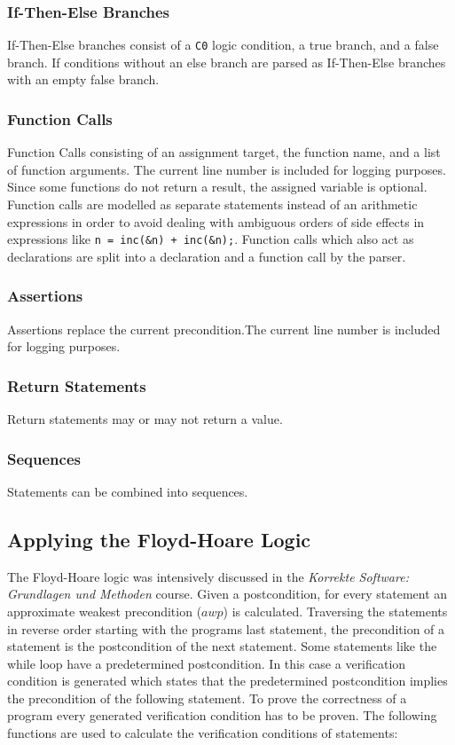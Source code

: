 \documentclass[12pt]{article}
\begin{document}
\subsubsection*{If-Then-Else Branches}
If-Then-Else branches consist of a \texttt{C0} logic condition, a true branch, and a false branch.
If conditions without an else branch are parsed as If-Then-Else branches with an empty false branch.

\subsubsection*{Function Calls}
Function Calls consisting of an assignment target, the function name, and a list of function arguments. The current line number is included for logging purposes. Since some functions do not return a result, the assigned variable is optional.
Function calls are modelled as separate statements instead of an arithmetic expressions in order to avoid dealing with ambiguous orders of side effects in expressions like \texttt{n = inc(\&n) + inc(\&n);}.
Function calls which also act as declarations are split into a declaration and a function call by the parser.

\subsubsection*{Assertions}
Assertions replace the current precondition.The current line number is included for logging purposes.

\subsubsection*{Return Statements}
Return statements may or may not return a value.

\subsubsection*{Sequences}
Statements can be combined into sequences.

\subsection{Applying the Floyd-Hoare Logic}

The Floyd-Hoare logic was intensively discussed in the \emph{Korrekte Software: Grundlagen und Methoden} course. 
Given a postcondition, for every statement an approximate weakest precondition ($awp$) is calculated.
Traversing the statements in reverse order starting with the programs last statement, the precondition of a statement is the postcondition of the next statement.
Some statements like the while loop have a predetermined postcondition.
In this case a verification condition is generated which states that the predetermined postcondition implies the precondition of the following statement.
To prove the correctness of a program every generated verification condition has to be proven.
The following functions are used to calculate the verification conditions of statements:
\end{document}
